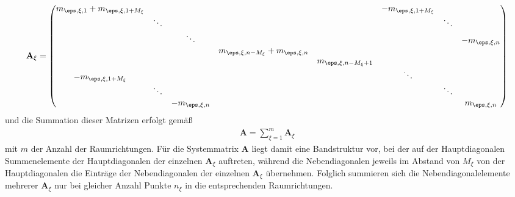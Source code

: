\documentclass[./Protokollheft.tex]{subfiles}
\begin{document}
\begin{align}
\mathbf{A}_{\xi} =
\begin{pmatrix} 
    m_{\eps, \xi, 1}+m_{\eps, \xi,1+M_\xi}	&  	 		&  				&  								&  					& -m_{\eps, \xi, 1+M_\xi}		& 				& 				\\
    	 						& \ddots	& 				& 								&	 				& 						& \ddots		& 				\\
   					 			& 			& \ddots		& 								&					& 						& 				& -m_{\eps, \xi, n}	\\ 
    					 		& 			& 				& m_{\eps, \xi, n-M_\xi}+m_{\eps, \xi, n} 	&					& 						& 				& 				\\ 
    							&  			&  				&  								&m_{\eps, \xi, n-M_\xi+1}	& 						& 				& 				\\ 
    -m_{\eps, \xi, 1+M_\xi}			& 			& 				& 								&					& \ddots				& 				& 				\\ 
    				 			& \ddots	& 				& 								&					& 						& \ddots		& 				\\ 
    				 			& 			& -m_{\eps, \xi, n}	& 								&					& 						& 				& m_{\eps, \xi, n}	\\  
\end{pmatrix}
\end{align}
und die Summation dieser Matrizen erfolgt gemäß
 \begin{align}
\mathbf{A} = \sum\limits_{\xi=1}^m \mathbf{A}_{\xi} 
 \end{align}
mit $m$ der Anzahl der Raumrichtungen. Für die Systemmatrix $\mathbf{A}$ liegt damit eine Bandstruktur vor, bei der auf der Hauptdiagonalen Summenelemente der Hauptdiagonalen der einzelnen $\mathbf{A}_{\xi}$ auftreten, während die Nebendiagonalen jeweils im Abstand von $M_{\xi}$ von der Hauptdiagonalen die Einträge der Nebendiagonalen der einzelnen $\mathbf{A}_{\xi}$ übernehmen. Folglich summieren sich die Nebendiagonalelemente mehrerer $\mathbf{A}_{\xi}$ nur bei gleicher Anzahl Punkte $n_{\xi}$ in die entsprechenden Raumrichtungen.
\end{document}
